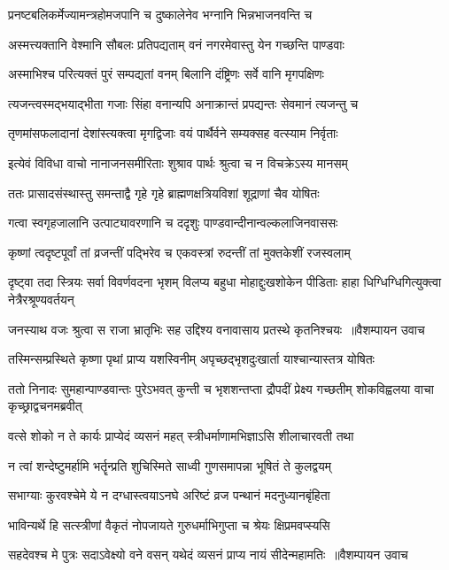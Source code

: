 \twolineshloka
{प्रनष्टबलिकर्मेज्यामन्त्रहोमजपानि च}
{दुष्कालेनेव भग्नानि भिन्नभाजनवन्ति च}


\twolineshloka
{अस्मत्त्यक्तानि वेश्मानि सौबलः प्रतिपद्यताम्}
{वनं नगरमेवास्तु येन गच्छन्ति पाण्डवाः}


\twolineshloka
{अस्माभिश्च परित्यक्तं पुरं सम्पद्यतां वनम्}
{बिलानि दंष्ट्रिणः सर्वे वानि मृगपक्षिणः}


\twolineshloka
{त्यजन्त्वस्मद्भयाद्भीता गजाः सिंहा वनान्यपि}
{अनाक्रान्तं प्रपद्यन्तः सेवमानं त्यजन्तु च}


\twolineshloka
{तृणमांसफलादानां देशांस्त्यक्त्वा मृगद्विजाः}
{वयं पार्थैर्वने सम्यक्सह वत्स्याम निर्वृताः}


\twolineshloka
{इत्येवं विविधा वाचो नानाजनसमीरिताः}
{शुश्राव पार्थः श्रुत्वा च न विचक्रेऽस्य मानसम्}


\twolineshloka
{ततः प्रासादसंस्थास्तु समन्ताद्वै गृहे गृहे}
{ब्राह्मणक्षत्रियविशां शूद्राणां चैव योषितः}


\twolineshloka
{गत्वा स्वगृहजालानि उत्पाट्यावरणानि च}
{ददृशुः पाण्डवान्दीनान्वल्कलाजिनवाससः}


\twolineshloka
{कृष्णां त्वदृष्टपूर्वां तां व्रजन्तीं पद्भिरेव च}
{एकवस्त्रां रुदन्तीं तां मुक्तकेशीं रजस्वलाम्}


\threelineshloka
{दृष्ट्वा तदा स्त्रियः सर्वा विवर्णवदना भृशम्}
{विलप्य बहुधा मोहाद्दुःखशोकेन पीडिताः}
{हाहा धिग्धिग्धिगित्युक्त्वा नेत्रैरश्रूण्यवर्तयन्}


\twolineshloka
{जनस्याथ वजः श्रुत्वा स राजा भ्रातृभिः सह}
{उद्दिश्य वनावासाय प्रतस्थे कृतनिश्चयः ॥वैशम्पायन उवाच}


\twolineshloka
{तस्मिन्सम्प्रस्थिते कृष्णा पृथां प्राप्य यशस्विनीम्}
{अपृच्छद्भृशदुःखार्ता याश्चान्यास्तत्र योषितः}


ततो निनादः सुमहान्पाण्डवान्तः पुरेऽभवत्
\twolineshloka
{कुन्ती च भृशशन्तप्ता द्रौपदीं प्रेक्ष्य गच्छतीम्}
{शोकविह्वलया वाचा कृच्छ्राद्वचनमब्रवीत्}


\twolineshloka
{वत्से शोको न ते कार्यः प्राप्येदं व्यसनं महत्}
{स्त्रीधर्माणामभिज्ञाऽसि शीलाचारवती तथा}


\twolineshloka
{न त्वां शन्देष्टुमर्हामि भर्तॄन्प्रति शुचिस्मिते}
{साध्वी गुणसमापन्ना भूषितं ते कुलद्वयम्}


\twolineshloka
{सभाग्याः कुरवश्चेमे ये न दग्धास्त्वयाऽनघे}
{अरिष्टं व्रज पन्थानं मदनुध्यानबृंहिता}


\twolineshloka
{भाविन्यर्थे हि सत्स्त्रीणां वैकृतं नोपजायते}
{गुरुधर्माभिगुप्ता च श्रेयः क्षिप्रमवप्स्यसि}


\twolineshloka
{सहदेवश्च मे पुत्रः सदाऽवेक्ष्यो वने वसन्}
{यथेदं व्यसनं प्राप्य नायं सीदेन्महामतिः ॥वैशम्पायन उवाच}


